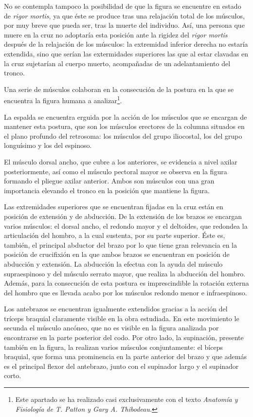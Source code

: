 No se contempla tampoco la posibilidad de que la figura se encuentre en estado de \textit{rigor mortis}, ya que éste se produce tras una relajación total de los músculos, por muy breve que pueda ser, tras la muerte del individuo. Así, una persona que muere en la cruz no adoptaría esta posición ante la rigidez del \textit{rigor mortis} después de la relajación de los músculos: la extremidad inferior derecha no estaría extendida, sino que serían las extermidades superiores las que al estar clavadas en la cruz sujetarían al cuerpo muerto, acompañadas de un adelantamiento del tronco. %

Una serie de músculos colaboran en la consecución de la postura en la que se encuentra la figura humana a analizar\footnote{Este apartado se ha realizado casi exclusivamente con el texto \textit{Anatomía y Fisiología de T. Patton y Gary A. Thibodeau.}}.

La espalda se encuentra erguida por la acción de los músculos que se encargan de mantener esta postura, que son los músculos erectores de la columna situados en el plano profundo del retrosoma: los músculos del grupo iliocostal, los del grupo longuísimo y los del espinoso.

El músculo dorsal ancho, que cubre a los anteriores, se evidencia a nivel axilar posteriormente, así como el músculo pectoral mayor se observa en la figura formando el pliegue axilar anterior. Ambos son músculos con una gran importancia elevando el tronco en la posición que mantiene la figura.

Las extremidades superiores que se encuentran fijadas en la cruz están en posición de extensión y de abducción. De la extensión de los brazos se encargan varios músculos: el dorsal ancho, el redondo mayor y el deltoides, que redondea la articulación del hombro, a la cual sustenta, por su parte superior. Éste es, también, el principal abductor del brazo por lo que tiene gran relevancia en la posición de crucifixión en la que ambos brazos se encuentran en posición de abducción y extensión. La abducción la efectua con la ayuda del músculo supraespinoso y del músculo serrato mayor, que realiza la abducción del hombro. Además, para la consecución de esta postura es imprescindible la rotación externa del hombro que es llevada acabo por los músculos redondo menor e infraespinoso.

Los antebrazos se encuentran igualmente extendidos gracias a la acción del tríceps braquial claramente visible en la obra estudiada. En este movimiento le secunda el músculo ancóneo, que no es visible en la figura analizada por encontrarse en la parte posterior del codo. Por otro lado, la supinación, presente también en la figura, la realizan varios músculos conjuntamente: el bíceps braquial, que forma una prominencia en la parte anterior del brazo y que además es el principal flexor del antebrazo, junto con el supinador largo y el supinador corto.

